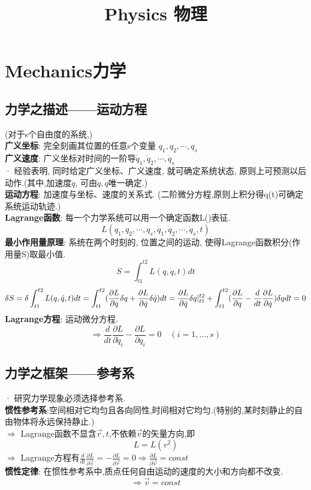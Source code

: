 \documentclass{article}
\title{Physics 物理}\author{}\date{}
\begin{document}
\maketitle
\tableofcontents


\section{Mechanics力学}
\subsection{力学之描述——运动方程}
(对于s个自由度的系统,)\\
\textbf{广义坐标}: 完全刻画其位置的任意s个变量 $q_{1},q_{2},\cdots,q_{s}$\\
\textbf{广义速度}: 广义坐标对时间的一阶导$\dot q_{1},\dot q_{2},\cdots,\dot q_{s}$\\
· 经验表明, 同时给定广义坐标、广义速度, 就可确定系统状态, 原则上可预测以后动作.(其中,加速度$\ddot q$, 可由$\dot q,q$唯一确定.)\\
\textbf{运动方程}: 加速度与坐标、速度的关系式. (二阶微分方程,原则上积分得q(t)可确定系统运动轨迹.)\\
\textbf{Lagrange函数}: 每一个力学系统可以用一个确定函数L()表征.
$$L(q_{1},q_{2},\cdots,q_{s},\dot q_{1},\dot q_{2},\cdots,\dot q_{s},t)$$
\textbf{最小作用量原理}: 系统在两个时刻的, 位置之间的运动, 使得Lagrange函数积分(作用量S)取最小值.
$$S = \int_{t1}^{t2} L(q,\dot q,t)dt$$
$$\delta S = \delta \int_{t1}^{t2} L(q,\dot q,t)dt = \int_{t1}^{t2} (\frac{\partial L}{\partial q}\delta q + \frac{\partial L}{\partial \dot q}\delta \dot q) dt = \frac{\partial L}{\partial \dot q} \delta q \arrowvert_{t1}^{t2} + \int_{t1}^{t2} (\frac{\partial L}{\partial q} - \frac{d}{dt} \frac{\partial L}{\partial \dot q}) \delta q dt = 0$$
\textbf{Lagrange方程}: 运动微分方程. 
$$\Rightarrow \frac{d}{dt}\frac{\partial L}{\partial \dot q_i} - \frac{\partial L}{\partial q_i} = 0\quad(i=1,\dots,s)$$


\subsection{力学之框架——参考系}
· 研究力学现象必须选择参考系.\\
\textbf{惯性参考系}:空间相对它均匀且各向同性,时间相对它均匀.(特别的,某时刻静止的自由物体将永远保持静止.)\\
$\Rightarrow$ Lagrange函数不显含$\vec r,t$,不依赖$\vec v$的矢量方向,即
$$L = L(v^2)$$
$\Rightarrow$ Lagrange方程有$\frac{d}{dt}\frac{\partial L}{\partial \vec v} = -\frac{\partial L}{\partial \vec r} = 0 \Rightarrow \frac{\partial L}{\partial \vec v}=const$\\
\textbf{惯性定律}: 在惯性参考系中,质点任何自由运动的速度的大小和方向都不改变.
$$\Rightarrow \vec v = const$$
\end{document}
